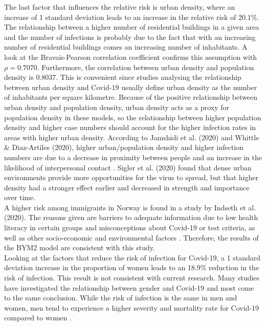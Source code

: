 The last factor that influences the relative risk is urban density, where an increase of 1 standard deviation leads to an increase in the relative risk of 20.1\%. The relationship between a higher number of residential buildings in a given area and the number of infections is probably due to the fact that with an increasing number of residential buildings comes an increasing number of inhabitants. A look at the Bravais-Pearson correlation coefficient confirms this assumption with $\rho=0.7070$. Furthermore, the correlation between urban density and population density is $0.8037$. This is convenient since studies analysing the relationship between urban density and Covid-19 usually define urban density as the number of inhabitants per square kilometre. Because of the positive relationship between urban density and population density, urban density acts as a proxy for population density in these models, so the relationship between higher population density and higher case numbers should account for the higher infection rates in areas with higher urban density. According to Jamshidi et al. (2020) and Whittle \& Diaz-Artiles (2020), higher urban/population density and higher infection numbers are due to a decrease in proximity between people and an increase in the likelihood of interpersonal contact \autocite[][]{jamshidi2020global, whittle2020ecological}. Sigler et al. (2020) found that dense urban environments provide more opportunities for the virus to spread, but that higher density had a stronger effect earlier and decreased in strength and importance over time\autocite[][]{sigler2020socio}. \\
A higher risk among immigrants in Norway is found in a study by Indseth et al. (2020). The reasons given are barriers to adequate information due to low health literacy in certain groups and misconceptions about Covid-19 or test criteria, as well as other socio-economic and environmental factors \autocite[][]{indseth2020covid}. Therefore, the results of the BYM2 model are consistent with this study. \\
Looking at the factors that reduce the risk of infection for Covid-19, a 1 standard deviation increase in the proportion of women leads to an 18.9\% reduction in the risk of infection. This result is not consistent with current research.  Many studies have investigated the relationship between gender and Covid-19 and most come to the same conclusion. While the risk of infection is the same in men and women, men tend to experience a higher severity and mortality rate for Covid-19 compared to women \autocite[][]{mukherjee2021covid, gausman2020sex, spagnolo2020sex, kopel2020racial}. \\
